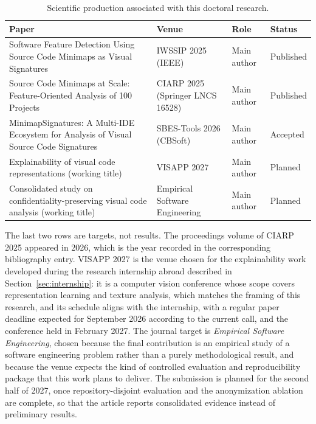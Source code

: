 \begin{table}[ht]
\centering
\caption{Scientific production associated with this doctoral research.}
\label{tab:publications}
\begin{tabular}{p{}p{}p{}p{}}
\toprule
\textbf{Paper} & \textbf{Venue} & \textbf{Role} & \textbf{Status} \\
\midrule
Software Feature Detection Using Source Code Minimaps as Visual Signatures \cite{gebara2025iwssip} & IWSSIP 2025 (IEEE) & Main author & Published \\
Source Code Minimaps at Scale: Feature-Oriented Analysis of 100 Projects \cite{gebara2025ciarp} & CIARP 2025 (Springer LNCS 16528) & Main author & Published \\
MinimapSignatures: A Multi-IDE Ecosystem for Analysis of Visual Source Code Signatures \cite{gebara2026minimapsignatures} & SBES-Tools 2026 (CBSoft) & Main author & Accepted \\
\midrule
Explainability of visual code representations (working title) & VISAPP 2027 & Main author & Planned \\
Consolidated study on confidentiality-preserving visual code analysis (working title) & Empirical Software Engineering & Main author & Planned \\
\bottomrule
\end{tabular}
\fautor
\end{table}

The last two rows are targets, not results. The proceedings volume of CIARP
2025 appeared in 2026, which is the year recorded in the corresponding
bibliography entry. VISAPP 2027 is the venue
chosen for the explainability work developed during the research internship
abroad described in Section~\ref{sec:internship}: it is a computer vision
conference whose scope covers representation learning and texture analysis,
which matches the framing of this research, and its schedule aligns with the
internship, with a regular paper deadline expected for September 2026 according
to the current call, and the conference held in February 2027. The journal target is \emph{Empirical Software
Engineering}, chosen because the final contribution is an empirical study of a
software engineering problem rather than a purely methodological result, and
because the venue expects the kind of controlled evaluation and reproducibility
package that this work plans to deliver. The submission is planned for the
second half of 2027, once repository-disjoint evaluation and the anonymization
ablation are complete, so that the article reports consolidated evidence
instead of preliminary results.

